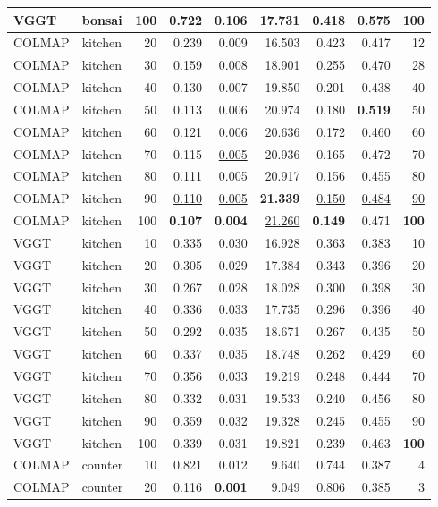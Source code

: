 \begin{table}[H]
\begin{tabular}{llrrrrrrr}
VGGT & bonsai & 100 & 0.722 & 0.106 & 17.731 & 0.418 & 0.575 & \textbf{100} \\
\midrule
COLMAP & kitchen & 20 & 0.239 & 0.009 & 16.503 & 0.423 & 0.417 & 12 \\
COLMAP & kitchen & 30 & 0.159 & 0.008 & 18.901 & 0.255 & 0.470 & 28 \\
COLMAP & kitchen & 40 & 0.130 & 0.007 & 19.850 & 0.201 & 0.438 & 40 \\
COLMAP & kitchen & 50 & 0.113 & 0.006 & 20.974 & 0.180 & \textbf{0.519} & 50 \\
COLMAP & kitchen & 60 & 0.121 & 0.006 & 20.636 & 0.172 & 0.460 & 60 \\
COLMAP & kitchen & 70 & 0.115 & \underline{0.005} & 20.936 & 0.165 & 0.472 & 70 \\
COLMAP & kitchen & 80 & 0.111 & \underline{0.005} & 20.917 & 0.156 & 0.455 & 80 \\
COLMAP & kitchen & 90 & \underline{0.110} & \underline{0.005} & \textbf{21.339} & \underline{0.150} & \underline{0.484} & \underline{90} \\
COLMAP & kitchen & 100 & \textbf{0.107} & \textbf{0.004} & \underline{21.260} & \textbf{0.149} & 0.471 & \textbf{100} \\
VGGT & kitchen & 10 & 0.335 & 0.030 & 16.928 & 0.363 & 0.383 & 10 \\
VGGT & kitchen & 20 & 0.305 & 0.029 & 17.384 & 0.343 & 0.396 & 20 \\
VGGT & kitchen & 30 & 0.267 & 0.028 & 18.028 & 0.300 & 0.398 & 30 \\
VGGT & kitchen & 40 & 0.336 & 0.033 & 17.735 & 0.296 & 0.396 & 40 \\
VGGT & kitchen & 50 & 0.292 & 0.035 & 18.671 & 0.267 & 0.435 & 50 \\
VGGT & kitchen & 60 & 0.337 & 0.035 & 18.748 & 0.262 & 0.429 & 60 \\
VGGT & kitchen & 70 & 0.356 & 0.033 & 19.219 & 0.248 & 0.444 & 70 \\
VGGT & kitchen & 80 & 0.332 & 0.031 & 19.533 & 0.240 & 0.456 & 80 \\
VGGT & kitchen & 90 & 0.359 & 0.032 & 19.328 & 0.245 & 0.455 & \underline{90} \\
VGGT & kitchen & 100 & 0.339 & 0.031 & 19.821 & 0.239 & 0.463 & \textbf{100} \\
\midrule
COLMAP & counter & 10 & 0.821 & 0.012 & 9.640 & 0.744 & 0.387 & 4 \\
COLMAP & counter & 20 & 0.116 & \textbf{0.001} & 9.049 & 0.806 & 0.385 & 3 \\

\end{tabular}
\end{table}
